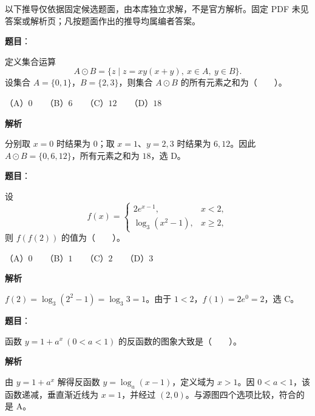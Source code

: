 

\begin{gktip}
以下推导仅依据固定候选题面，由本库独立求解，不是官方解析。固定 PDF 未见答案或解析页；凡按题面作出的推导均属编者答案。
\end{gktip}

\begin{answer}

\textbf{题目}：

定义集合运算
\nopagebreak[4]
\[
A\odot B=\{z\mid z=xy(x+y),\ x\in A,\ y\in B\}.
\]
设集合 $A=\{0,1\}$，$B=\{2,3\}$，则集合 $A\odot B$ 的所有元素之和为\mbox{（　　）}。

（A）$0$　　（B）$6$　　（C）$12$　　（D）$18$

\textbf{解析}

分别取 $x=0$ 时结果为 $0$；取 $x=1$、$y=2,3$ 时结果为 $6,12$。因此 $A\odot B=\{0,6,12\}$，所有元素之和为 $18$，选 D。


\end{answer}
\begin{answer}

\textbf{题目}：

设
\nopagebreak[4]
\[
f(x)=\begin{cases}
2e^{x-1}, & x<2,\\
\log_3(x^2-1), & x\ge 2,
\end{cases}
\]
则 $f(f(2))$ 的值为\mbox{（　　）}。

（A）$0$　　（B）$1$　　（C）$2$　　（D）$3$

\textbf{解析}

$f(2)=\log_3(2^2-1)=\log_3 3=1$。由于 $1<2$，$f(1)=2e^0=2$，选 C。


\end{answer}
\begin{answer}

\textbf{题目}：

函数 $y=1+a^x\ (0<a<1)$ 的反函数的图象大致是\mbox{（　　）}。
\nopagebreak[4]
\begin{center}\end{center}
\nopagebreak[4]
\textbf{解析}

由 $y=1+a^x$ 解得反函数 $y=\log_a(x-1)$，定义域为 $x>1$。因 $0<a<1$，该函数递减，垂直渐近线为 $x=1$，并经过 $(2,0)$。与源图四个选项比较，符合的是 A。


\end{answer}
